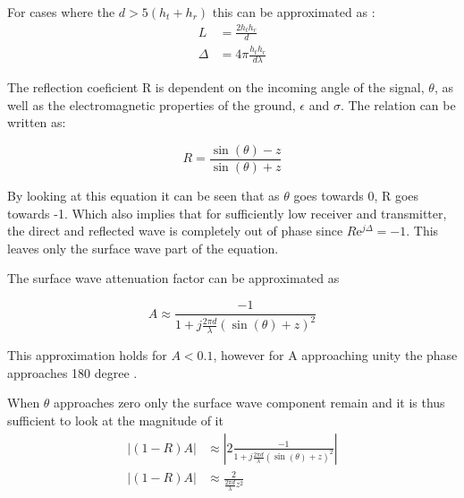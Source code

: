 For cases where the $d > 5(h_t+h_r)$ this can be approximated as \citep{Bullington}:
\begin{align}
L &=\frac{2h_th_r}{d} \\
\Delta &= 4\pi\frac{h_th_r}{d\lambda}
\end{align}

The reflection coeficient R is dependent on the incoming angle of the signal, $\theta$, as well as the electromagnetic properties of the ground, $\epsilon$ and $\sigma$. The relation can be written as\citep{Bullington}:

\begin{equation}
R=\frac{\sin(\theta)-z}{\sin(\theta)+z}
\end{equation}
\begin{where}
\end{where}

By looking at this equation it can be seen that as $\theta$ goes towards 0, R goes towards -1. Which also implies that for sufficiently low receiver and transmitter, the direct and reflected wave is completely out of phase since $R\text{e}^{j\Delta} = -1$. This leaves only the surface wave part of the equation.

The surface wave attenuation factor can be approximated as\citep{Bullington}

\begin{equation}
A\approx\frac{-1}{1+j\frac{2\pi d}{\lambda}\left(\sin(\theta)+z\right)^2}
\end{equation}

This approximation holds for $A<0.1$, however for A approaching unity the phase approaches 180 degree \citep{Bullington}. 

When $\theta$ approaches zero only the surface wave component remain and it is thus sufficient to look at the magnitude of it \citep{Chong}
\begin{align}
|(1-R)A| &\approx \left|2 \frac{-1}{1+j\frac{2\pi d}{\lambda}\left(\sin(\theta)+z\right)^2} \right| \\
|(1-R)A| &\approx \frac{2}{\frac{2\pi d}{\lambda}z^2} \label{eq:surfaceApprox}
\end{align}


